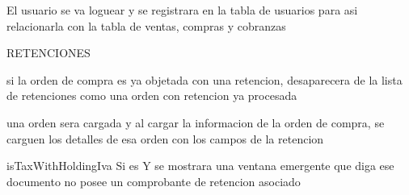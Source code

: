 El usuario se va loguear y se registrara en la tabla de usuarios para asi relacionarla con la tabla de
ventas, compras y cobranzas 


RETENCIONES 

si la orden de compra es ya objetada con una retencion, desaparecera de la lista de retenciones como una 
orden con retencion ya procesada 


una orden sera cargada y al cargar la informacion de la orden de compra, se carguen los detalles de esa
orden con los campos de la retencion 


isTaxWithHoldingIva Si es Y se mostrara una ventana emergente que diga ese documento no posee un comprobante de 
retencion asociado



